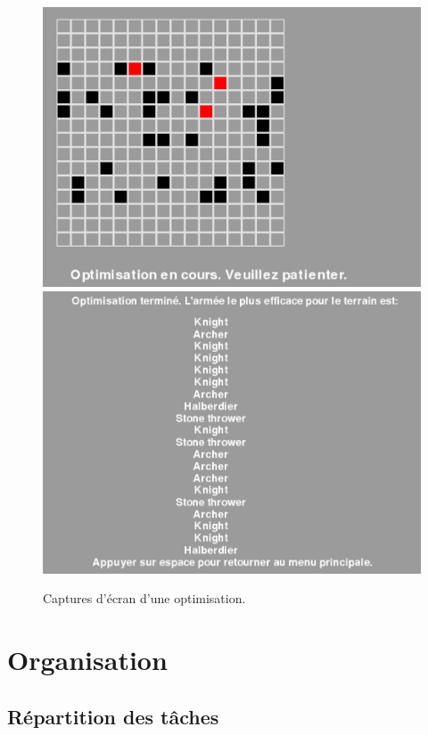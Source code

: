 \documentclass[a4paper, 11pt]{article}
\begin{document}
\begin{figure}

\includegraphics[scale=0.3]{Optimisation-InProgress}
\includegraphics[scale=0.3]{Optimisation-Finished}

\caption{Captures d'écran d'une optimisation.}

\end{figure}

\section{Organisation}

\subsection{Répartition des tâches}
\end{document}
